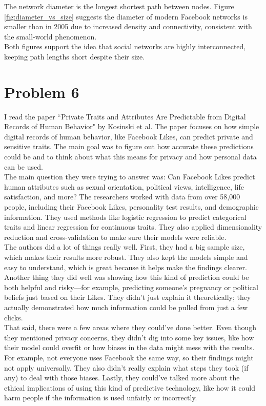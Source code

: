 \documentclass[12pt]{article}
\begin{document}
\noindent The network diameter is the longest shortest path between nodes. Figure \ref{fig:diameter_vs_size} suggests the diameter of modern Facebook networks is smaller than in 2005 due to increased density and connectivity, consistent with the small-world phenomenon.\\

\noindent Both figures support the idea that social networks are highly interconnected, keeping path lengths short despite their size.
\section*{Problem 6}

I read the paper ``Private Traits and Attributes Are Predictable from Digital Records of Human Behavior" by Kosinski et al. The paper focuses on how simple digital records of human behavior, like Facebook Likes, can predict private and sensitive traits. The main goal was to figure out how accurate these predictions could be and to think about what this means for privacy and how personal data can be used.\\

\noindent The main question they were trying to answer was: Can Facebook Likes predict human attributes such as sexual orientation, political views, intelligence, life satisfaction, and more? The researchers worked with data from over 58,000 people, including their Facebook Likes, personality test results, and demographic information. They used methods like logistic regression to predict categorical traits and linear regression for continuous traits. They also applied dimensionality reduction and cross-validation to make sure their models were reliable.\\

\noindent The authors did a lot of things really well. First, they had a big sample size, which makes their results more robust. They also kept the models simple and easy to understand, which is great because it helps make the findings clearer. Another thing they did well was showing how this kind of prediction could be both helpful and risky—for example, predicting someone's pregnancy or political beliefs just based on their Likes. They didn't just explain it theoretically; they actually demonstrated how much information could be pulled from just a few clicks.\\

\noindent That said, there were a few areas where they could've done better. Even though they mentioned privacy concerns, they didn't dig into some key issues, like how their model could overfit or how biases in the data might mess with the results. For example, not everyone uses Facebook the same way, so their findings might not apply universally. They also didn't really explain what steps they took (if any) to deal with those biases. Lastly, they could've talked more about the ethical implications of using this kind of predictive technology, like how it could harm people if the information is used unfairly or incorrectly.\\
\end{document}
